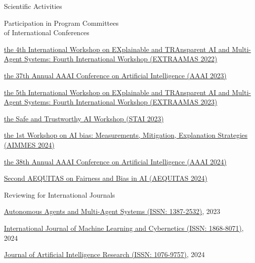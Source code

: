 \documentclass{resume} %
\begin{document}
\begin{rSection}{Scientific Activities}
        \begin{rSubsection2}{Participation in Program Committees\\ of International Conferences}
            \item \href{https://extraamas.ehealth.hevs.ch/archive.html#organizations-2022}{the 4th International Workshop on EXplainable and TRAnsparent AI and Multi-Agent Systems: Fourth International Workshop (EXTRAAMAS 2022)}
            \item \href{https://apice.unibo.it/xwiki/bin/view/Event/Aaai2023}{the 37th Annual AAAI Conference on Artificial Intelligence (AAAI 2023)}
            \item \href{https://apice.unibo.it/xwiki/bin/view/Event/Prima2023}{the 5th International Workshop on EXplainable and TRAnsparent AI and Multi-Agent Systems: Fourth International Workshop (EXTRAAMAS 2023)}
            \item \href{https://web.archive.org/web/20240225110652/https://www.stai.uk/stai-23-iclp}{the Safe and Trustworthy AI Workshop (STAI 2023)}
            \item \href{https://fairnesscluster.github.io/aimmes23.github.io/index.html}{the 1st Workshop on AI bias: Measurements, Mitigation, Explanation Strategies (AIMMES 2024)}
            \item \href{https://apice.unibo.it/xwiki/bin/view/Event/Aaai2024}{the 38th Annual AAAI Conference on Artificial Intelligence (AAAI 2024)}
            \item \href{https://aequitas-aod.github.io/aequitas-ecai24.github.io/pc-member.html}{Second AEQUITAS on Fairness and Bias in AI (AEQUITAS 2024)}
        \end{rSubsection2}


        \begin{rSubsection2}{Reviewing for International Journals}
            \item \href{https://link.springer.com/journal/10458}{Autonomous Agents and Multi-Agent Systems (ISSN: 1387-2532)}, 2023
            \item \href{https://link.springer.com/journal/13042}{International Journal of Machine Learning and Cybernetics (ISSN: 1868-8071)}, 2024
            \item \href{https://www.jair.org/index.php/jair/index}{Journal of Artificial Intelligence Research (ISSN: 1076-9757)}, 2024
        \end{rSubsection2}


\end{rSection}
\end{document}
